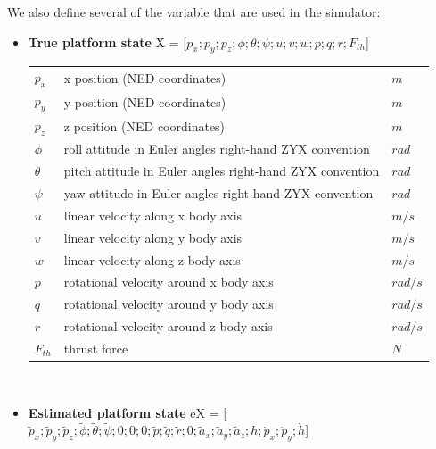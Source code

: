 \documentclass[a4paper,11pt]{report}
\begin{document}
We also define several of the variable that are used in the simulator:
\begin{itemize}

\item \textbf{True platform state} X = [$p_x;p_y;p_z;\phi;\theta;\psi;u;v;w;p;q;r;F_{th}$]

\begin{tabular}{lll}
    $p_x$ & x position (NED coordinates)                            & $m$\\
    $p_y$ & y position (NED coordinates)                            & $m$\\
    $p_z$ & z position (NED coordinates)                            & $m$\\
   $\phi$ & roll attitude in Euler angles right-hand ZYX convention & $rad$\\
 $\theta$ & pitch attitude in Euler angles right-hand ZYX convention & $rad$\\
   $\psi$ & yaw attitude in Euler angles right-hand ZYX convention  & $rad$\\
     $u$  & linear velocity along x body axis                      & $m/s$\\
     $v$  & linear velocity along y body axis                      & $m/s$\\
     $w$  & linear velocity along z body axis                      & $m/s$\\
     $p$  & rotational velocity around x body axis                  & $rad/s$\\ 
     $q$  & rotational velocity around y body axis                  & $rad/s$\\ 
     $r$  & rotational velocity around z body axis                  & $rad/s$\\ 
 $F_{th}$ & thrust force                                            & $N$
\end{tabular} 
\\

\item  \textbf{Estimated platform state} eX = [$\tilde{p}_x;\tilde{p}_y;\tilde{p}_z;\tilde{\phi};\tilde{\theta};\tilde{\psi};0;0;0;\tilde{p};\tilde{q};\tilde{r};0;\tilde{a}_x;\tilde{a}_y;\tilde{a}_z;h;\dot{p}_x;\dot{p}_y;\dot{h}$]


\end{itemize}
\end{document}
